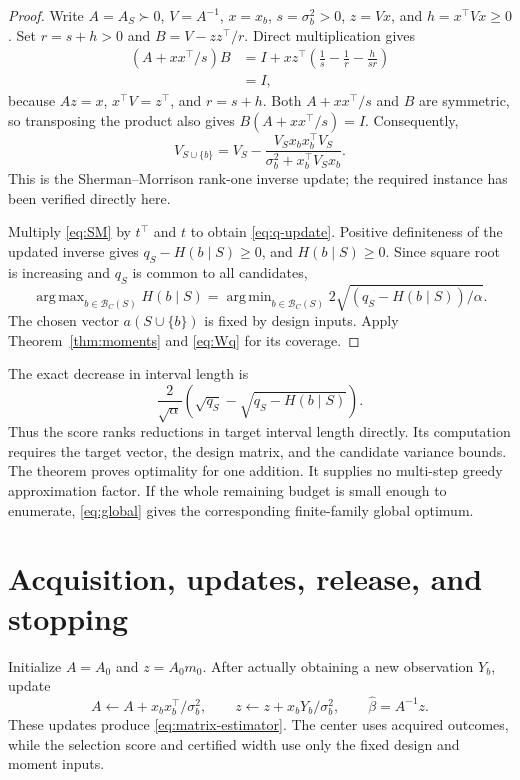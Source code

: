 \documentclass[11pt]{article}
\theoremstyle{remark}
\DeclareMathOperator*{\argmin}{arg\,min}
\DeclareMathOperator*{\argmax}{arg\,max}
\begin{document}
\begin{proof}
Write $A=A_S\succ0$, $V=A^{-1}$, $x=x_b$, $s=\sigma_b^2>0$, $z=Vx$, and $h=x^\top Vx\ge0$. Set $r=s+h>0$ and $B=V-zz^\top/r$. Direct multiplication gives
\begin{align*}
 (A+xx^\top/s)B
 &=I+xz^\top\left(\frac1s-\frac1r-\frac{h}{sr}\right)\\
 &=I,
\end{align*}
because $Az=x$, $x^\top V=z^\top$, and $r=s+h$. Both $A+xx^\top/s$ and $B$ are symmetric, so transposing the product also gives $B(A+xx^\top/s)=I$. Consequently,
\begin{equation}
 V_{S\cup\{b\}}
   =V_S-\frac{V_Sx_bx_b^\top V_S}
                 {\sigma_b^2+x_b^\top V_Sx_b}.                \label{eq:SM}
\end{equation}
This is the Sherman--Morrison rank-one inverse update; the required instance has been verified directly here.

Multiply \eqref{eq:SM} by $t^\top$ and $t$ to obtain \eqref{eq:q-update}. Positive definiteness of the updated inverse gives $q_S-H(b\mid S)\ge0$, and $H(b\mid S)\ge0$. Since square root is increasing and $q_S$ is common to all candidates,
\[
 \argmax_{b\in\mathcal B_C(S)}H(b\mid S)
 =\argmin_{b\in\mathcal B_C(S)}
       2\sqrt{(q_S-H(b\mid S))/\alpha}.
\]
The chosen vector $a(S\cup\{b\})$ is fixed by design inputs. Apply Theorem~\ref{thm:moments} and \eqref{eq:Wq} for its coverage.
\end{proof}

The exact decrease in interval length is
\[
 \frac{2}{\sqrt\alpha}
   \left(\sqrt{q_S}-\sqrt{q_S-H(b\mid S)}\right).
\]
Thus the score ranks reductions in target interval length directly. Its computation requires the target vector, the design matrix, and the candidate variance bounds. The theorem proves optimality for one addition. It supplies no multi-step greedy approximation factor. If the whole remaining budget is small enough to enumerate, \eqref{eq:global} gives the corresponding finite-family global optimum.

\section{Acquisition, updates, release, and stopping}
Initialize $A=A_0$ and $z=A_0m_0$. After actually obtaining a new observation $Y_b$, update
\[
 A\leftarrow A+x_bx_b^\top/\sigma_b^2,\qquad
 z\leftarrow z+x_bY_b/\sigma_b^2,\qquad
 \widehat\beta=A^{-1}z.
\]
These updates produce \eqref{eq:matrix-estimator}. The center uses acquired outcomes, while the selection score and certified width use only the fixed design and moment inputs.
\end{document}
